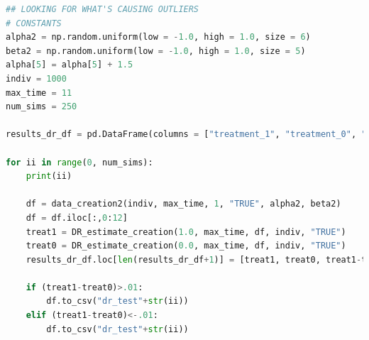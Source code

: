 \begin{lstlisting}[language=Python]
## LOOKING FOR WHAT'S CAUSING OUTLIERS 
# CONSTANTS 
alpha2 = np.random.uniform(low = -1.0, high = 1.0, size = 6)
beta2 = np.random.uniform(low = -1.0, high = 1.0, size = 5)
alpha[5] = alpha[5] + 1.5
indiv = 1000 
max_time = 11
num_sims = 250

results_dr_df = pd.DataFrame(columns = ["treatment_1", "treatment_0", "difference"])

for ii in range(0, num_sims): 
    print(ii) 
    
    df = data_creation2(indiv, max_time, 1, "TRUE", alpha2, beta2) 
    df = df.iloc[:,0:12]
    treat1 = DR_estimate_creation(1.0, max_time, df, indiv, "TRUE")
    treat0 = DR_estimate_creation(0.0, max_time, df, indiv, "TRUE")
    results_dr_df.loc[len(results_dr_df+1)] = [treat1, treat0, treat1-treat0]
    
    if (treat1-treat0)>.01:
        df.to_csv("dr_test"+str(ii))
    elif (treat1-treat0)<-.01:
        df.to_csv("dr_test"+str(ii))
\end{lstlisting}

